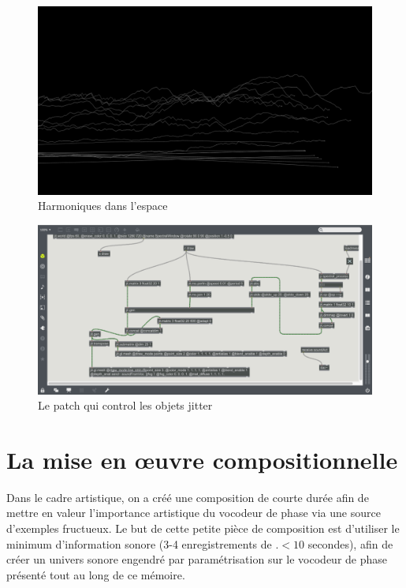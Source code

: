     \begin{figure}
        \centering
        \includegraphics[width = \textwidth ]{Graphs/SpectralWindow.png}
        \caption{Harmoniques dans l'espace}
        \label{SpectralWindow}
    \end{figure} 

    \begin{figure}
        \centering
        \includegraphics[width = \textwidth ]{Graphs/SpectralDraw.png}
        \caption{Le patch qui control les objets jitter}
        \label{SpectralDraw}
    \end{figure} 


\section{La mise en œuvre compositionnelle}

Dans le cadre artistique, on a créé une composition de courte durée afin de mettre en valeur l'importance artistique du vocodeur de phase via une source d'exemples fructueux. Le but de cette petite pièce de composition est d'utiliser le minimum d'information sonore (3-4 enregistrements de $.<10$ secondes), afin de créer un univers sonore engendré par paramétrisation sur le vocodeur de phase présenté tout au long de ce mémoire.

